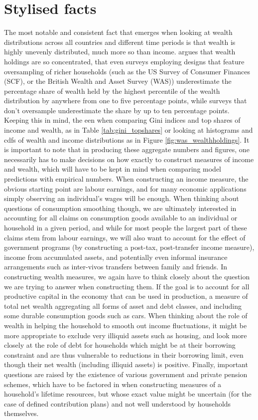\section{Stylised facts}
The most notable and consistent fact that emerges when looking at wealth
distributions across all countries and different time periods is that wealth
is highly unevenly distributed, much more so than income. \citet{Vermeulen2014}
argues that wealth holdings are so concentrated, that even surveys employing 
designs that feature oversampling of richer households (such as the US Survey of
Consumer Finances (SCF), or the British Wealth and Asset Survey (WAS)) 
underestimate the percentage share of wealth held by the highest percentile of the
wealth distribution by anywhere from one to five percentage points, while surveys
that don't oversample underestimate the share by up to ten percentage points.
Keeping this in mind, the een when comparing Gini indices and top shares of income and wealth, as in
Table \ref{tab:gini_topshares} or looking at histograms and cdfs of wealth and
income distributions as in Figure \ref{fig:was_wealthholdings}. It is important to note
that in producing these aggregate numbers and figures, one necessarily has
to make decisions on how exactly to construct measures of income and wealth,
which will have to be kept in mind when comparing model predictions with
empirical numbers. When constructing an income measure, the obvious starting
point are labour earnings, and for many economic applications simply
observing an individual's wages will be enough. When thinking about questions
of consumption smoothing though, we are ultimately interested in accounting
for all claims on consumption goods available to an individual or household
in a given period, and while for most people the largest part of these claims
stem from labour earnings, we will also want to account for the effect of
government programs (by constructing a post-tax, post-transfer income measure),
income from accumulated assets, and potentially even informal insurance
arrangements such as inter-vivos transfers between family and friends.
In constructing wealth measures, we again have to think closely about the
question we are trying to answer when constructing them. If the goal is to
account for all productive capital in the economy that can be used in
production, a measure of total net wealth aggregating all forms of asset and
debt classes, and including some durable consumption goods such as cars. When
thinking about the role of wealth in helping the household to smooth out
income fluctuations, it might be more appropriate to exclude very illiquid
assets such as housing, and look more closely at the role of debt for households
which might be at their borrowing constraint and are thus vulnerable to
reductions in their borrowing limit, even though their net wealth (including
illiquid assets) is positive. Finally, important questions are raised by
the existence of various government and private pension schemes, which have
to be factored in when constructing measures of a household's lifetime
resources, but whose exact value might be uncertain (for the case of defined
contribution plans) and not well understood by households themselves.


